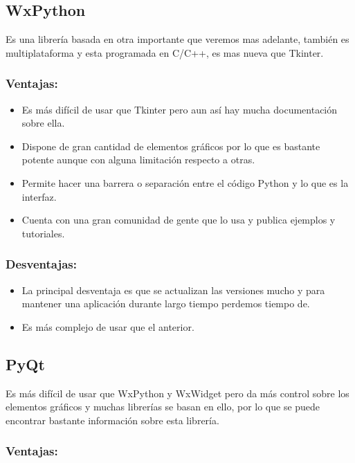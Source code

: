 \subsection{WxPython}
Es una librería basada en otra importante que veremos mas adelante, también es multiplataforma y esta programada en C/C++, es mas nueva que Tkinter.
\subsubsection{Ventajas:}
\begin{itemize}
\item Es más difícil de usar que Tkinter pero aun así hay mucha documentación sobre ella.

\item Dispone de gran cantidad de elementos gráficos por lo que es bastante potente aunque con alguna limitación respecto a otras.

\item Permite hacer una barrera o separación entre el código Python y lo que es la interfaz.
\item Cuenta con una gran comunidad de gente que lo usa y publica ejemplos y tutoriales.
\end{itemize}

\subsubsection{Desventajas:}
\begin{itemize}
\item La principal desventaja es que se actualizan las versiones mucho y para mantener una aplicación durante largo tiempo perdemos tiempo de.
\item Es más complejo de usar que el anterior.
\end{itemize}

\subsection{PyQt}
Es más difícil de usar que WxPython y WxWidget pero da más control sobre los elementos gráficos y muchas librerías se basan en ello, por lo que se puede encontrar bastante información sobre esta librería.
\\

\subsubsection{Ventajas:}

